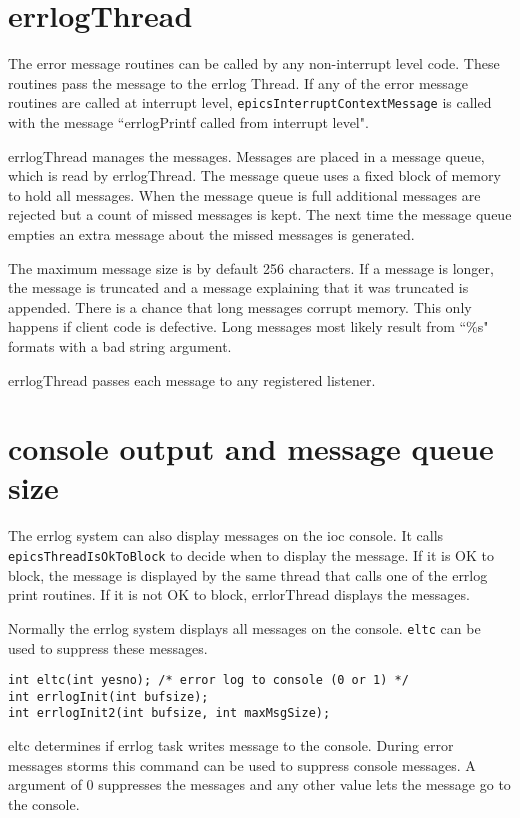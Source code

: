 \section{errlogThread}

The error message routines can be called by any non-interrupt level code. These routines pass the message to the errlog 
Thread. If any of the error message routines are called at interrupt level,  \verb|epicsInterruptContextMessage| is 
called with the message ``errlogPrintf called from interrupt level".

errlogThread manages the messages. Messages are placed in a message queue, which is read by errlogThread. The 
message queue uses a fixed block of memory to hold all messages. When the message queue is full additional messages 
are rejected but a count of missed messages is kept. The next time the message queue empties an extra message about the 
missed messages is generated.

The maximum message size is by default 256  characters. If a message is longer, the message is truncated and a message 
explaining that it was truncated is appended. There is a chance that long messages corrupt memory. This  only happens if 
client code is defective. Long messages most likely result from ``\%s" formats with a bad string argument.

errlogThread passes each message to any registered listener.

\section{console output and message queue size}

The errlog system can also display messages on the ioc console. It calls \verb|epicsThreadIsOkToBlock| to decide when 
to display the message. If it is OK to block, the message is displayed by the same thread that calls one of the errlog print 
routines. If it is not OK to block, errlorThread displays the messages.

Normally the errlog system displays all messages on the console. \verb|eltc| can be used to suppress these messages.

\begin{verbatim}
int eltc(int yesno); /* error log to console (0 or 1) */
int errlogInit(int bufsize);
int errlogInit2(int bufsize, int maxMsgSize);
\end{verbatim}

eltc determines if errlog task writes message to the console. During error messages storms  this  command can be used to 
suppress console messages. A argument of 0 suppresses the messages and any other value lets the message go to the 
console. 

